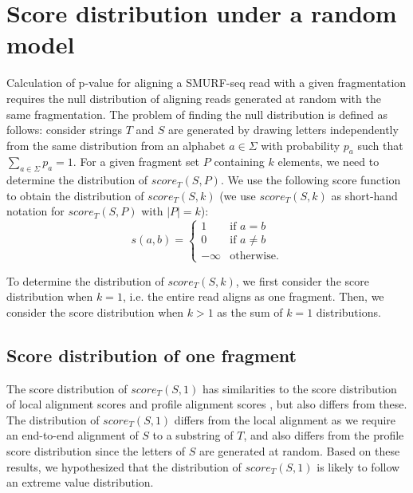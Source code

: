 \section{Score distribution under a random model}
\label{smurf_rand_dist}
Calculation of p-value for aligning a SMURF-seq read with a given
fragmentation requires the null distribution of aligning reads
generated at random with the same fragmentation. The
problem of finding the null distribution is defined as follows:
consider strings $T$ and $S$ are generated by drawing letters independently
from the same distribution from an alphabet $a \in \Sigma$ with
probability $p_a$ such that $\sum_{a \in \Sigma} p_a = 1$.  For a given
fragment set $P$ containing $k$ elements, we need to determine the
distribution of $score_T(S, P)$.
We use the following score function to obtain the distribution of
$score_T(S,k)$ (we use $score_T(S,k)$ as short-hand notation for
$score_T(S, P)$ with $|P| = k$):
\begin{equation*}
\label{exact_score}
s(a,b)=\begin{cases} 1 & \text{if } a = b \\
            0 & \text{if } a\neq b \\
            -\infty & \text{otherwise.}
\end{cases}
\end{equation*}

To determine the distribution of $score_T(S, k)$, we first consider the score
distribution when $k = 1$, i.e. the entire read aligns as one fragment.
Then, we consider the score distribution when $k > 1$ as the sum of $k =
1$ distributions.

\subsection{Score distribution of one fragment}
The score distribution of $score_T(S,1)$ has similarities to the score
distribution of local alignment scores
\citep{smith1983statistical,altschul199627} and profile alignment scores
\citep{goldstein1994approximations}, but also differs from these.  The
distribution of $score_T(S,1)$ differs from the local alignment as we
require an end-to-end alignment of $S$ to a substring of $T$, and also
differs from the profile score distribution since the letters of $S$ are
generated at random.
Based on these results, we hypothesized that the distribution of
$score_T(S,1)$ is likely to follow an extreme value distribution.

